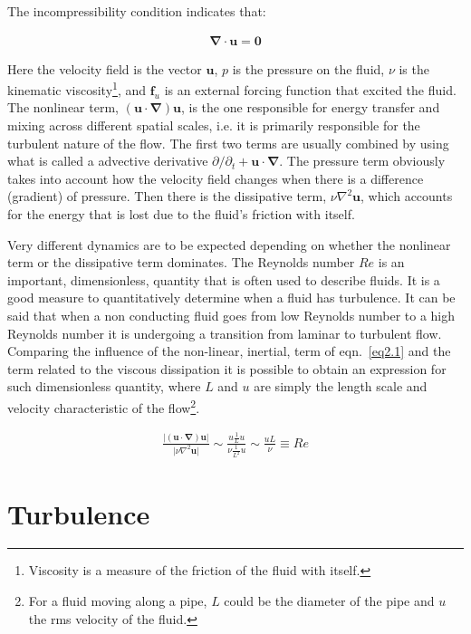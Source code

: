 \documentclass[12pt,a4paper]{report}
\begin{document}
The incompressibility condition indicates that: 

\begin{align}
 \bm \nabla \cdot \bm u = \bm 0
 \label{eq2.2}
\end{align}

Here the velocity field is the vector $\bm u$, $p$ is the pressure on the fluid, $\nu$ is the kinematic viscosity\footnote{Viscosity is a measure of the friction of the fluid with itself.}, and $\bm f_u$ is an external forcing function that excited the fluid. The nonlinear term, $(\bm u \cdot \bm \nabla) \bm u$, is the one responsible for energy transfer and mixing across different spatial scales, i.e. it is primarily responsible for the turbulent nature of the flow. The first two terms are usually combined by using what is called a advective derivative $\partial / \partial_t + \bm u \cdot \bm \nabla$. The pressure term obviously takes into account how the velocity field changes when there is a difference (gradient) of pressure. Then there is the dissipative term, $\nu \nabla^2 \bm u$, which accounts for the energy that is lost due to the fluid's friction with itself.

Very different dynamics are to be expected depending on whether the nonlinear term or the dissipative term dominates. The Reynolds number $Re$ is an important, dimensionless, quantity that is often used to describe fluids. It is a good measure to quantitatively determine when a fluid has turbulence. It can be said that when a non conducting fluid goes from low Reynolds number to a high Reynolds number it is undergoing a transition from laminar to turbulent flow. Comparing the influence of the non-linear, inertial, term of eqn.~\ref{eq2.1} and the term related to the viscous dissipation it is possible to obtain an expression for such dimensionless quantity, where $L$ and $u$ are simply the length scale and velocity characteristic of the flow\footnote{For a fluid moving along a pipe, $L$ could be the diameter of the pipe and $u$ the rms velocity of the fluid.}.

\begin{align}
 \frac{\vert (\bm u \cdot \bm \nabla) \bm u \vert}{\vert \nu \nabla^2 \bm u \vert} \sim \frac{u \frac{1}{L} u}{\nu \frac{1}{L^2} u} \sim \frac{u L}{\nu} \equiv Re \nonumber
\end{align}

\section{Turbulence}
\label{sec2.2}
\end{document}
